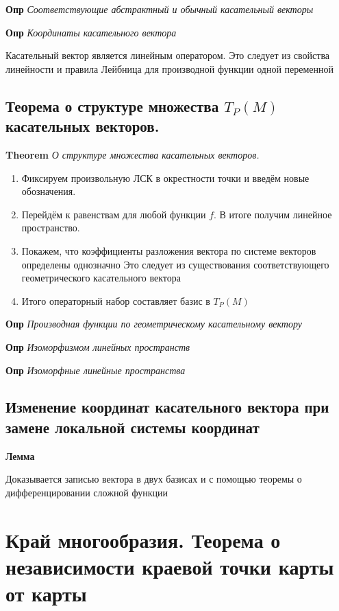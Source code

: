 \documentclass[a4paper, 14pt]{article}
\begin{document}
    \textbf{Опр} \textit{Соответствующие абстрактный и обычный касательный векторы}
    
    \textbf{Опр} \textit{Координаты касательного вектора}
    
    Касательный вектор является линейным оператором.
    Это следует из свойства линейности и правила Лейбница для производной функции одной переменной
    
    \subsection{Теорема о структуре множества $T_P (M)$ касательных векторов.}
    
    \textbf{Theorem} \textit{О структуре множества касательных векторов.}
    
    \begin{enumerate}
        \item Фиксируем произвольную ЛСК в окрестности точки и введём новые обозначения.
        \item Перейдём к равенствам для любой функции $f$.
        В итоге получим линейное пространство.
        \item Покажем, что коэффициенты разложения вектора по системе векторов определены однозначно
        Это следует из существования соответствующего геометрического касательного вектора
        \item Итого операторный набор составляет базис в $T_P (M)$
    \end{enumerate}
    
    \textbf{Опр} \textit{Производная функции по геометрическому касательному вектору}
    
    \textbf{Опр} \textit{Изоморфизмом линейных пространств}
    
    \textbf{Опр} \textit{Изоморфные линейные пространства}
    
    \subsection{Изменение координат касательного вектора при замене локальной системы координат}
    
    \textbf{Лемма}
    
    Доказывается записью вектора в двух базисах и с помощью теоремы о дифференцировании сложной функции
    
    \section{Край многообразия.
    Теорема о независимости краевой точки карты от карты}
    
\end{document}
